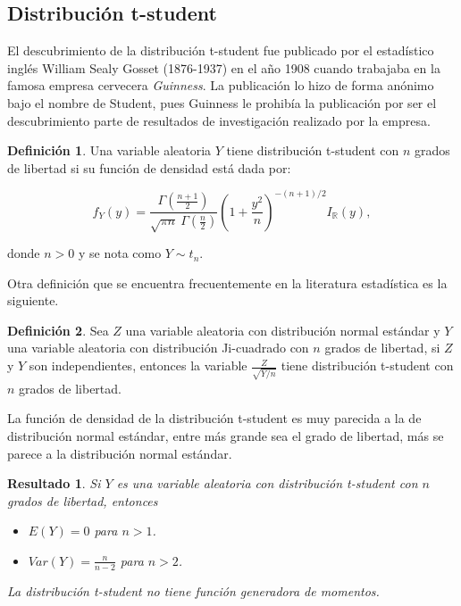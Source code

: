 \documentclass[
  10pt,
  spanish,
]{book}
\providecommand{\tightlist}{%
  \setlength{\itemsep}{0pt}\setlength{\parskip}{0pt}}
\newtheorem{proposition}{Resultado}[chapter]
\theoremstyle{definition}
\newtheorem{definition}{Definición}[chapter]
\theoremstyle{definition}
\theoremstyle{definition}
\theoremstyle{definition}
\theoremstyle{remark}
\begin{document}
\hypertarget{distribuciuxf3n-t-student}{%
\subsection{Distribución t-student}\label{distribuciuxf3n-t-student}}

El descubrimiento de la distribución t-student fue publicado por el estadístico inglés William Sealy Gosset (1876-1937) en el año 1908 cuando trabajaba en la famosa empresa cervecera \emph{Guinness}. La publicación lo hizo de forma anónimo bajo el nombre de Student, pues Guinness le prohibía la publicación por ser el descubrimiento parte de resultados de investigación realizado por la empresa.

\begin{definition}
\protect\hypertarget{def:unnamed-chunk-43}{}{\label{def:unnamed-chunk-43} }Una variable aleatoria \(Y\) tiene distribución t-student con \(n\) grados de libertad si su función de densidad está dada por:

\begin{equation}
f_Y(y)=\frac{\Gamma(\frac{n+1}{2})}{\sqrt{\pi n}\ \Gamma(\frac{n}{2})}\left(1+\frac{y^2}{n}\right)^{-(n+1)/2}I_\mathbb{R}(y),
\end{equation}

donde \(n>0\) y se nota como \(Y\sim t_n\).
\end{definition}

Otra definición que se encuentra frecuentemente en la literatura estadística es la siguiente.

\begin{definition}
\protect\hypertarget{def:unnamed-chunk-44}{}{\label{def:unnamed-chunk-44} }Sea \(Z\) una variable aleatoria con distribución normal estándar y \(Y\) una variable aleatoria con distribución Ji-cuadrado con \(n\) grados de libertad, si \(Z\) y \(Y\) son independientes, entonces la variable \(\frac{Z}{\sqrt{Y/n}}\) tiene distribución t-student con \(n\) grados de libertad.
\end{definition}

La función de densidad de la distribución t-student es muy parecida a la de distribución normal estándar, entre más grande sea el grado de libertad, más se parece a la distribución normal estándar.

\begin{proposition}
\protect\hypertarget{prp:unnamed-chunk-45}{}{\label{prp:unnamed-chunk-45} }Si \(Y\) es una variable aleatoria con distribución t-student con \(n\) grados de libertad, entonces

\begin{itemize}
\tightlist
\item
  \(E(Y)=0\) para \(n>1\).
\item
  \(Var(Y)=\frac{n}{n-2}\) para \(n>2\).
\end{itemize}

La distribución t-student no tiene función generadora de momentos.
\end{proposition}
\end{document}
